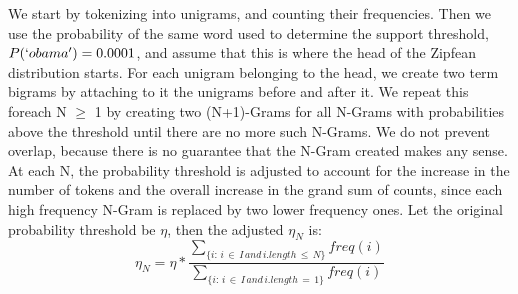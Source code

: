 \documentclass{sig-alternate}
\begin{document}
We start by tokenizing into unigrams, and counting their frequencies. Then we use the probability of the same word used to determine the support threshold, $P(`obama') = 0.0001$, and assume that this is where the head of the Zipfean distribution starts. For each unigram belonging to the head, we create two term bigrams by attaching to it the unigrams before and after it. We repeat this foreach N $\ge$ 1 by creating two (N+1)-Grams for all N-Grams with probabilities above the threshold until there are no more such N-Grams. We do not prevent overlap, because there is no guarantee that the N-Gram created makes any sense. At each N, the probability threshold is adjusted to account for the increase in the number of tokens and the overall increase in the grand sum of counts, since each high frequency N-Gram is replaced by two lower frequency ones. Let the original probability threshold be $\eta$, then the adjusted $\eta_N$ is:
\begin{equation}\eta_N = \eta * \frac{\sum_{\{i:\, i \,\in\, I\, and\, i.length \,\le\, N\}}{freq(i)}}{\sum_{\{i:\, i\, \in\, I \,and \,i.length\,=\,1\}}{freq(i)}}\end{equation}

\end{document}
